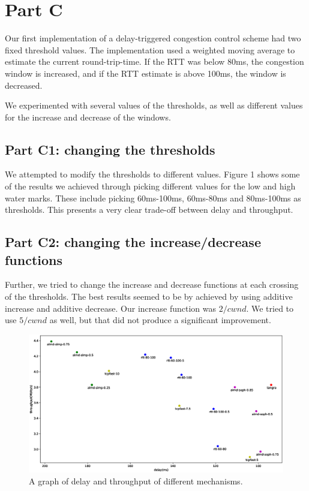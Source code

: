 \documentclass[12pt]{article}
\begin{document}
\section*{Part C}

Our first implementation of a delay-triggered congestion control scheme had two
fixed threshold values. The implementation used a weighted moving average to
estimate the current round-trip-time. If the RTT was below 80ms, the congestion
window is increased, and if the RTT estimate is above 100ms, the window is
decreased.

We experimented with several values of the thresholds, as well as different
values for the increase and decrease of the windows.

\subsection*{Part C1: changing the thresholds}

We attempted to modify the thresholds to different values. Figure 1 shows some
of the results we achieved through picking different values for the low and high
water marks. These include picking 60ms-100ms, 60ms-80ms and 80ms-100ms as
thresholds. This presents a very clear trade-off between delay and throughput.

\subsection*{Part C2: changing the increase/decrease functions}

Further, we tried to change the increase and decrease functions at each crossing
of the thresholds. The best results seemed to be by achieved by using additive
increase and additive decrease. Our increase function was $2/cwnd$. We tried to
use $5/cwnd$ as well, but that did not produce a significant improvement.

\begin{figure}[h]
 \includegraphics[width=\textwidth,height=\textheight,keepaspectratio]{figure_1.eps}
 \caption{A graph of delay and throughput of different mechanisms.}
 \label{fig:all}
\end{figure}
\end{document}
